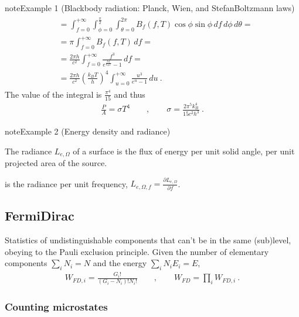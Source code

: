 \documentclass[letterpaper,10pt,english]{jupyterBook}
\begin{document}
\begin{sphinxadmonition}{note}{Example 1 (Black\sphinxhyphen{}body radiation: Planck, Wien, and Stefan\sphinxhyphen{}Boltzmann laws)}
\begin{equation*}
\begin{split}
\begin{aligned}
  & = \int_{f=0}^{+\infty} \int_{\phi = 0}^{\frac{\pi}{2}} \int_{\theta=0}^{2\pi} B_{f}(f,T) \cos \phi \sin \phi \, df \, d\phi \, d \theta = \\
  & = \pi \int_{f=0}^{+\infty} B_{f}(f,T) \, d f = \\
  & = \frac{2 \pi h}{c^2} \int_{f=0}^{+\infty} \frac{f^3}{e^{\frac{hf}{k_B T}} - 1} \, d f = \\
  & = \frac{2 \pi h}{c^2} \left( \frac{k_B T}{h} \right)^4 \int_{u=0}^{+\infty} \frac{u^3}{e^u - 1} \, d u \ .
\end{aligned}\end{split}
\end{equation*}
\sphinxAtStartPar
The value of the integral is \(\frac{\pi^4}{15}\) and thus
\begin{equation*}
\begin{split}\frac{P}{A} = \sigma T^4 \qquad , \qquad \sigma = \frac{2 \pi^5 k_B^4}{15 c^2 h^3} \ .\end{split}
\end{equation*}\end{sphinxadmonition}
\label{ch/statistical-mechanics/notes:example-1}
\begin{sphinxadmonition}{note}{Example 2 (Energy density and radiance)}



\sphinxAtStartPar
{} The radiance \(L_{e,\Omega}\) of a surface is the flux of energy per unit solid angle, per unit projected area of the source.

\sphinxAtStartPar
{} is the radiance per unit frequency, \(L_{e, \Omega, f} = \frac{\partial L_{e,\Omega}}{\partial f}\).
\end{sphinxadmonition}


\subsection{Fermi\sphinxhyphen{}Dirac}
\label{\detokenize{ch/statistical-mechanics/notes:fermi-dirac}}\label{\detokenize{ch/statistical-mechanics/notes:statistical-mechanics-notes-distributions-fd}}
\sphinxAtStartPar
Statistics of undistinguishable components that can’t be in the same (sub)level, obeying to the Pauli exclusion principle.
Given the number of elementary components \(\sum_{i} N_i = N\) and the energy \(\sum_{i} N_i E_i = E\),
\begin{equation}\label{equation:ch/statistical-mechanics/notes:eq:fd}
\begin{split}W_{FD,i} = \frac{G_i!}{(G_i-N_i)! N_i!} \qquad , \qquad W_{FD} = \prod_i W_{FD,i} \ .\end{split}
\end{equation}\subsubsection*{Counting microstates}
\end{document}
